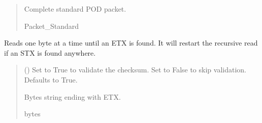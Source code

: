 \documentclass[letterpaper,10pt,english]{sphinxmanual}
\begin{document}
\begin{fulllineitems}
\begin{fulllineitems}
\begin{quote}
\begin{description}
\sphinxAtStartPar
Complete standard POD packet.

\sphinxAtStartPar
Packet\_Standard

\end{description}\end{quote}

\end{fulllineitems}


\begin{fulllineitems}
\label{\detokenize{Morelia.Devices:Morelia.Devices.BasicPodProtocol.Pod._Read_ToETX}}
\pysigstartsignatures
{}
\pysigstopsignatures
\sphinxAtStartPar
Reads one byte at a time until an ETX is found. It will restart the recursive read if an STX         is found anywhere.
\begin{quote}\begin{description}
\sphinxAtStartPar
{} (\sphinxstyleliteralemphasis{\sphinxupquote{, }}) \textendash{} Set to True to validate the checksum. Set to False to skip                 validation. Defaults to True.

\sphinxAtStartPar
Bytes string ending with ETX.

\sphinxAtStartPar
bytes

\end{description}\end{quote}

\end{fulllineitems}



\end{fulllineitems}
\end{document}
